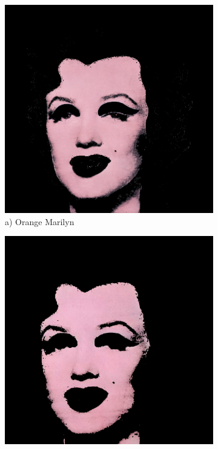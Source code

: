 \documentclass{article}
\begin{document}
\begin{figure}[htbp]
    \centering
    \begin{subfigure}[b]{0.19\textwidth}
        \includegraphics[width=\textwidth]{main_files/figure-latex/8_4_orange_marilyn_face_extraction.jpg}
        \caption*{a) Orange Marilyn}
    \end{subfigure}
    \hfill
    \begin{subfigure}[b]{0.19\textwidth}
        \includegraphics[width=\textwidth]{main_files/figure-latex/9_4_red_marilyn_face_extraction.jpg}

\end{subfigure}
\end{figure}
\end{document}
